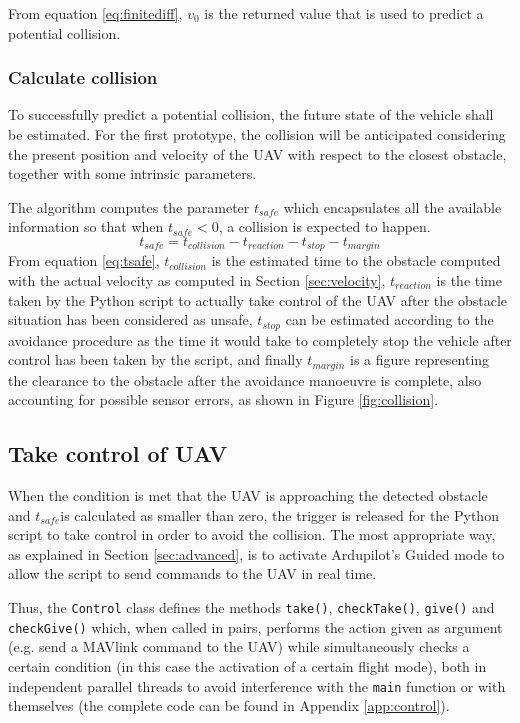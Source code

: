 From equation \eqref{eq:finitediff}, $v_0$ is the returned value that is used to predict a potential collision.

\subsubsection{Calculate collision}

To successfully predict a potential collision, the future state of the vehicle shall be estimated.
For the first prototype, the collision will be anticipated considering the present position and velocity of the UAV with respect to the closest obstacle, together with some intrinsic parameters.

The algorithm computes the parameter $t_{safe}$ which encapsulates all the available information so that when $t_{safe}<0$, a collision is expected to happen.
\begin{equation}
	t_{safe}=t_{collision}-t_{reaction}-t_{stop}-t_{margin}
	\label{eq:tsafe}
\end{equation}
From equation \eqref{eq:tsafe}, $t_{collision}$ is the estimated time to the obstacle computed with the actual velocity as computed in Section \ref{sec:velocity}, $t_{reaction}$ is the time taken by the Python script to actually take control of the UAV after the obstacle situation has been considered as unsafe, $t_{stop}$ can be estimated according to the avoidance procedure as the time it would take to completely stop the vehicle after control has been taken by the script, and finally $t_{margin}$ is a figure representing the clearance to the obstacle after the avoidance manoeuvre is complete, also accounting for possible sensor errors, as shown in Figure \ref{fig:collision}.



\subsection{Take control of UAV} \label{sec:takeControl}

When the condition is met that the UAV is approaching the detected obstacle and $t_{safe}$is calculated as smaller than zero, the trigger is released for the Python script to take control in order to avoid the collision.
The most appropriate way, as explained in Section \ref{sec:advanced}, is to activate Ardupilot's Guided mode to allow the script to send commands to the UAV in real time.

Thus, the \texttt{Control} class defines the methods \texttt{take()}, \texttt{checkTake()}, \texttt{give()} and \texttt{checkGive()} which, when called in pairs, performs the action given as argument (e.g. send a MAVlink command to the UAV) while simultaneously checks a certain condition (in this case the activation of a certain flight mode), both in independent parallel threads to avoid interference with the \texttt{main} function or with themselves (the complete code can be found in Appendix \ref{app:control}).

